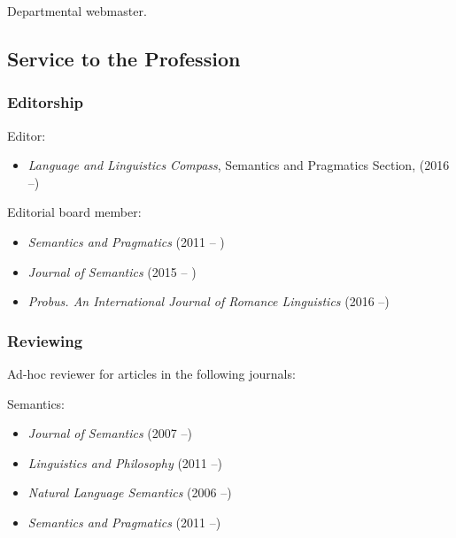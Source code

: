 \documentclass[11pt]{article}
\begin{document}
Departmental webmaster.

\subsection*{Service to the Profession}

\subsubsection*{Editorship}

Editor:

\begin{itemize}

\item[] \textit{Language and Linguistics Compass}, Semantics and Pragmatics Section, (2016 --)

\end{itemize}

Editorial board member: 

\begin{itemize}
  \item[] \textit{Semantics and Pragmatics} (2011 -- )
  \item[] \textit{Journal of Semantics} (2015 -- )
  \item[] \textit{Probus. An International Journal of Romance Linguistics} (2016 --)
\end{itemize}

\vspace{-10pt}

\subsubsection*{Reviewing}

Ad-hoc reviewer for articles in the following journals:

Semantics: 

\begin{itemize}
\item[] \textit{Journal of Semantics} (2007 --)
\item[] \textit{Linguistics and Philosophy} (2011 --)
\item[]\textit{Natural Language Semantics} (2006 --) 
\item[] \textit{Semantics and Pragmatics} (2011 --)
\end{itemize}
\end{document}
